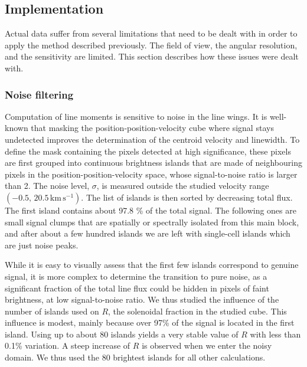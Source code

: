 \documentclass[structabstract]{aa}
\newcommand{\emm}[1]{\ensuremath{#1}}
\newcommand{\emr}[1]{\emm{\mathrm{#1}}}
\newcommand{\unit}[1]{\emr{\,#1}}
\newcommand{\kms}{\unit{km\,s^{-1}}}
\begin{document}
\subsection{Implementation}

Actual data suffer from several limitations that need to be dealt with in order to apply the method described previously. The field of view, the angular resolution, and the sensitivity are limited. This section describes how these issues were dealt with.

\subsubsection{Noise filtering}
\label{sec:noisefiltering}
Computation of line moments is sensitive to noise in the line wings. It is well-known that masking the position-position-velocity cube where signal stays undetected improves the determination of the centroid velocity and linewidth. To define the mask containing the pixels detected at high significance, these pixels are first grouped into continuous brightness islands that are made of neighbouring pixels in the position-position-velocity space, whose signal-to-noise ratio is larger than 2. The noise level, $\sigma$, is measured outside the studied velocity range $(-0.5,\, 20.5\kms)$. The list of islands is then sorted by decreasing total flux. The first island contains
about 97.8 \% of the total signal. The following ones are small signal clumps that are spatially or spectrally isolated from this main block, and after about a few hundred islands we are left with single-cell islands which are just noise peaks. 

While it is easy to visually assess that the first few islands correspond to genuine signal, it is more complex to determine the transition to pure noise, as a significant fraction of the total line flux could be hidden in pixels of faint brightness, at low signal-to-noise ratio. We thus studied the influence of the number of islands used on $R$, the solenoidal fraction in the studied cube. This influence is modest, mainly because over 97\% of the signal is located in the first island. Using up to about 80 islands yields a very stable value of $R$ with less than 0.1\% variation. A steep increase of $R$ is observed when we enter the noisy domain. We thus used the 80 brightest islands for all other calculations.
\end{document}
